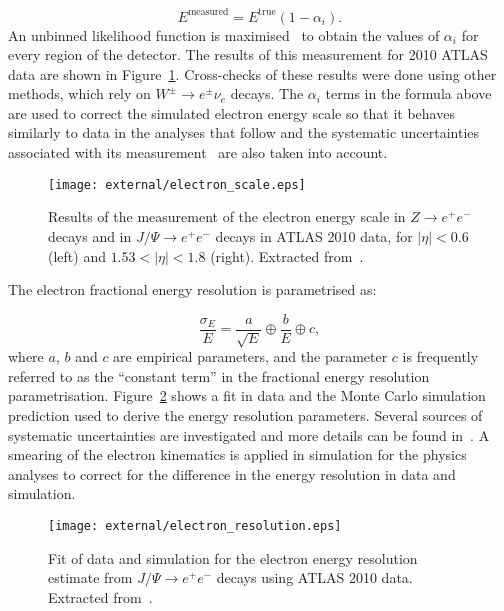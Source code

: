 \begin{equation}
\displaystyle
E^{\textrm{measured}} = E^{\textrm{true}} (1 - \alpha_i).
\label{eq:electron_scale}
\end{equation}
An unbinned likelihood function is maximised~\cite{electron2010} to obtain the values of $\alpha_i$ for every region of the detector. The results of this measurement
for 2010 ATLAS data are shown in Figure~\ref{fig:electron_scale}. Cross-checks of these results were done using other methods, which rely on $W^{\pm} \rightarrow e^{\pm}\nu_e$
decays.
The $\alpha_i$ terms in the formula above are used to correct the simulated electron energy scale so that it behaves similarly to data
in the analyses that follow and the systematic uncertainties associated
with its measurement~\cite{electron2010} are also taken into account.

\begin{figure}
\centering
\texttt{[image: external/electron\_scale.eps]}
\caption{Results of the measurement of the electron energy scale in $Z \rightarrow e^+e^-$ decays and in $J/\Psi \rightarrow e^+e^-$ decays in ATLAS 2010 data, for $|\eta| < 0.6$ (left) and $1.53 < |\eta| < 1.8$ (right). Extracted from~\cite{electron2010}.}
\label{fig:electron_scale}
\end{figure}

The electron fractional energy resolution is parametrised as:

\begin{equation}
\displaystyle
\frac{\sigma_E}{E} = \frac{a}{\sqrt{E}} \oplus \frac{b}{E} \oplus c,
\label{eq:electron_resolution}
\end{equation}
where $a$, $b$ and $c$ are empirical parameters, and the parameter $c$ is frequently referred to as the ``constant term'' in the fractional energy resolution parametrisation.
Figure~\ref{fig:electron_resolution} shows a fit in data and the Monte Carlo simulation prediction used to derive the energy resolution parameters. Several sources of systematic
uncertainties are investigated and more details can be found in~\cite{electron2010}. A smearing of the electron kinematics is applied in simulation for the physics analyses
to correct for the difference in the energy resolution in data and simulation.

\begin{figure}
\centering
\texttt{[image: external/electron\_resolution.eps]}
\caption{Fit of data and simulation for the electron energy resolution estimate from $J/\Psi \rightarrow e^+e^-$ decays using ATLAS 2010 data. Extracted from~\cite{electron2010}.}
\label{fig:electron_resolution}
\end{figure}

